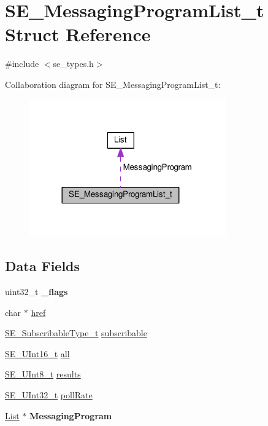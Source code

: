 \hypertarget{structSE__MessagingProgramList__t}{}\section{S\+E\+\_\+\+Messaging\+Program\+List\+\_\+t Struct Reference}
\label{structSE__MessagingProgramList__t}


{\ttfamily \#include $<$se\+\_\+types.\+h$>$}



Collaboration diagram for S\+E\+\_\+\+Messaging\+Program\+List\+\_\+t\+:\nopagebreak
\begin{figure}[H]
\begin{center}
\leavevmode
\includegraphics[width=240pt]{structSE__MessagingProgramList__t__coll__graph}
\end{center}
\end{figure}
\subsection*{Data Fields}
\begin{DoxyCompactItemize}
\item 
uint32\+\_\+t {\bfseries \+\_\+flags}
\item 
char $\ast$ \hyperlink{group__MessagingProgramList_gacb5855c7001a05d1d58e43cc706e70e9}{href}
\item 
\hyperlink{group__SubscribableType_ga5c41f553d369710ed34619266bf2551e}{S\+E\+\_\+\+Subscribable\+Type\+\_\+t} \hyperlink{group__MessagingProgramList_gaa0e2fbe57fd90cc867bac24472c1d8df}{subscribable}
\item 
\hyperlink{group__UInt16_gac68d541f189538bfd30cfaa712d20d29}{S\+E\+\_\+\+U\+Int16\+\_\+t} \hyperlink{group__MessagingProgramList_ga67178b17c2bc14694747e71a75651161}{all}
\item 
\hyperlink{group__UInt8_gaf7c365a1acfe204e3a67c16ed44572f5}{S\+E\+\_\+\+U\+Int8\+\_\+t} \hyperlink{group__MessagingProgramList_gacdca1166c19d3e607e004b7511f6f70b}{results}
\item 
\hyperlink{group__UInt32_ga70bd4ecda3c0c85d20779d685a270cdb}{S\+E\+\_\+\+U\+Int32\+\_\+t} \hyperlink{group__MessagingProgramList_gabeb074e1c506b7857d306774059cf652}{poll\+Rate}
\item 
\hyperlink{structList}{List} $\ast$ {\bfseries Messaging\+Program}
\end{DoxyCompactItemize}


